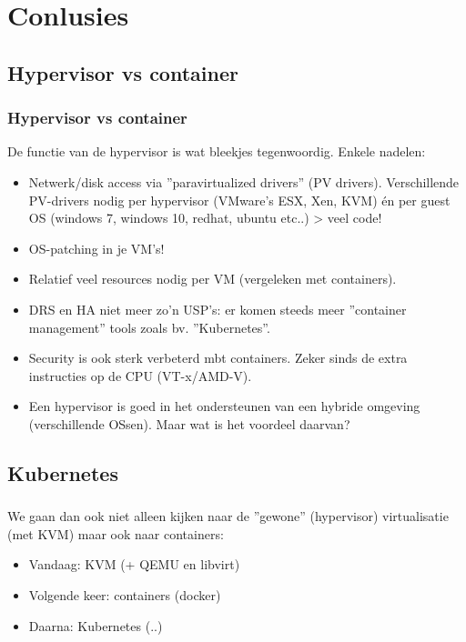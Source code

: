 \section{Conlusies}
\subsection {Hypervisor vs container}
\begin{styleframe}
    \frametitle{Hypervisor vs container}
De functie van de hypervisor is wat bleekjes tegenwoordig. Enkele nadelen:
\pause
\begin{itemize}
    \item Netwerk/disk access via ''paravirtualized drivers'' (PV drivers). Verschillende PV-drivers nodig per hypervisor (VMware's ESX, Xen, KVM) \'en per guest OS (windows 7, windows 10, redhat, ubuntu etc..) \-> veel code!
    \pause
    \item OS-patching in je VM's!
    \pause
    \item Relatief veel resources nodig per VM (vergeleken met containers).
    \pause
    \item DRS en HA niet meer zo'n USP's: er komen steeds meer ''container management'' tools zoals bv. ''Kubernetes''.
    \pause
    \item Security is ook sterk verbeterd mbt containers. Zeker sinds de extra instructies op de CPU (VT-x/AMD-V).
    \pause
    \item Een hypervisor is goed in het ondersteunen van een hybride omgeving (verschillende OS\-sen). Maar wat is het voordeel daarvan?
\end{itemize}
\end{styleframe}

\subsection {Kubernetes}
\begin{styleframe}
    \frametitle{}
We gaan dan ook niet alleen kijken naar de ''gewone'' (hypervisor) virtualisatie (met KVM) maar ook naar containers:
\pause
\begin{itemize}
    \item Vandaag: KVM (+ QEMU en libvirt)
    \pause
    \item Volgende keer: containers (docker)
    \pause
    \item Daarna: Kubernetes (..)
\end{itemize}
\end{styleframe}

